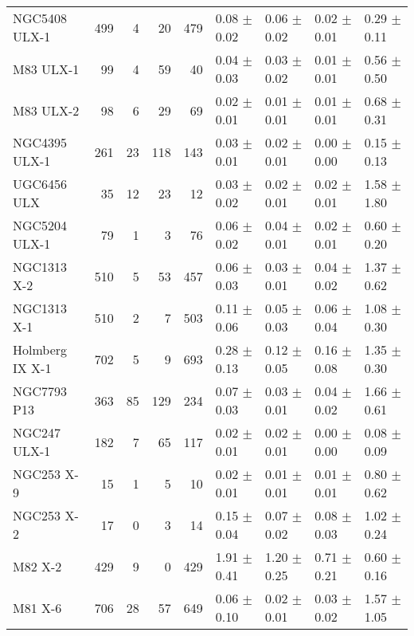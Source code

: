 \begin{tabular}{lrrrrllll}
     NGC5408 ULX-1 &  499 &   4 &   20 &   479 &     0.08 $\pm$ 0.02 &    0.06 $\pm$ 0.02 &     0.02 $\pm$ 0.01 &  0.29 $\pm$ 0.11 \\
         M83 ULX-1 &   99 &   4 &   59 &    40 &     0.04 $\pm$ 0.03 &    0.03 $\pm$ 0.02 &     0.01 $\pm$ 0.01 &  0.56 $\pm$ 0.50 \\
         M83 ULX-2 &   98 &   6 &   29 &    69 &     0.02 $\pm$ 0.01 &    0.01 $\pm$ 0.01 &     0.01 $\pm$ 0.01 &  0.68 $\pm$ 0.31 \\
     NGC4395 ULX-1 &  261 &  23 &  118 &   143 &     0.03 $\pm$ 0.01 &    0.02 $\pm$ 0.01 &     0.00 $\pm$ 0.00 &  0.15 $\pm$ 0.13 \\
       UGC6456 ULX &   35 &  12 &   23 &    12 &     0.03 $\pm$ 0.02 &    0.02 $\pm$ 0.01 &     0.02 $\pm$ 0.01 &  1.58 $\pm$ 1.80 \\
     NGC5204 ULX-1 &   79 &   1 &    3 &    76 &     0.06 $\pm$ 0.02 &    0.04 $\pm$ 0.01 &     0.02 $\pm$ 0.01 &  0.60 $\pm$ 0.20 \\
       NGC1313 X-2 &  510 &   5 &   53 &   457 &     0.06 $\pm$ 0.03 &    0.03 $\pm$ 0.01 &     0.04 $\pm$ 0.02 &  1.37 $\pm$ 0.62 \\
       NGC1313 X-1 &  510 &   2 &    7 &   503 &     0.11 $\pm$ 0.06 &    0.05 $\pm$ 0.03 &     0.06 $\pm$ 0.04 &  1.08 $\pm$ 0.30 \\
   Holmberg IX X-1 &  702 &   5 &    9 &   693 &     0.28 $\pm$ 0.13 &    0.12 $\pm$ 0.05 &     0.16 $\pm$ 0.08 &  1.35 $\pm$ 0.30 \\
       NGC7793 P13 &  363 &  85 &  129 &   234 &     0.07 $\pm$ 0.03 &    0.03 $\pm$ 0.01 &     0.04 $\pm$ 0.02 &  1.66 $\pm$ 0.61 \\
      NGC247 ULX-1 &  182 &   7 &   65 &   117 &     0.02 $\pm$ 0.01 &    0.02 $\pm$ 0.01 &     0.00 $\pm$ 0.00 &  0.08 $\pm$ 0.09 \\
        NGC253 X-9 &   15 &   1 &    5 &    10 &     0.02 $\pm$ 0.01 &    0.01 $\pm$ 0.01 &     0.01 $\pm$ 0.01 &  0.80 $\pm$ 0.62 \\
        NGC253 X-2 &   17 &   0 &    3 &    14 &     0.15 $\pm$ 0.04 &    0.07 $\pm$ 0.02 &     0.08 $\pm$ 0.03 &  1.02 $\pm$ 0.24 \\
           M82 X-2 &  429 &   9 &    0 &   429 &     1.91 $\pm$ 0.41 &    1.20 $\pm$ 0.25 &     0.71 $\pm$ 0.21 &  0.60 $\pm$ 0.16 \\
           M81 X-6 &  706 &  28 &   57 &   649 &     0.06 $\pm$ 0.10 &    0.02 $\pm$ 0.01 &     0.03 $\pm$ 0.02 &  1.57 $\pm$ 1.05 \\

\end{tabular}
